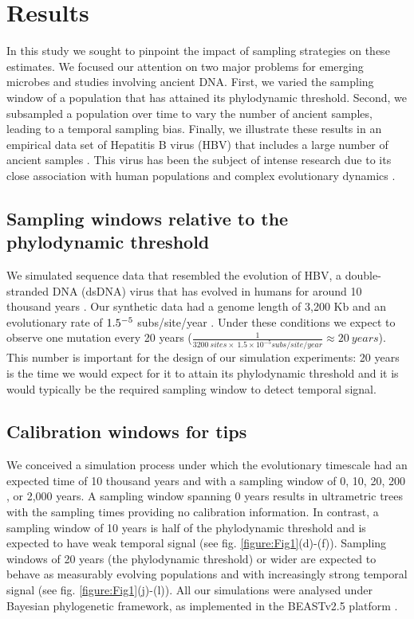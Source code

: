 \documentclass[11pt]{article}
\begin{document}
\section{Results}
In this study we sought to pinpoint the impact of sampling strategies on these estimates. We focused our attention on two major problems for emerging microbes and studies involving ancient DNA. First, we varied the sampling window of a population that has attained its phylodynamic threshold. Second, we subsampled a population over time to vary the number of ancient samples, leading to a temporal sampling bias. Finally, we illustrate these results in an empirical data set of Hepatitis B virus (HBV) that includes a large number of ancient samples \citep{kocher2021ten}. This virus has been the subject of intense research due to its close association with human populations and complex evolutionary dynamics \citep{paraskevis2013dating, ross2018paradox, kahila2012tracing}.

\subsection{Sampling windows relative to the phylodynamic threshold}
We simulated sequence data that resembled the evolution of HBV, a double-stranded DNA (dsDNA) virus that has evolved in humans for around 10 thousand years \citep{kocher2021ten}. Our synthetic data had a genome length of 3,200 Kb and an evolutionary rate of $1.5\time10^{-5}$ subs/site/year \citep{kocher2021ten, muhlemann2018ancient}. Under these conditions we expect to observe one mutation every 20 years ($\frac{1}{3200\ sites \times\ 1.5\times10^{-5}subs/site/year}\approx20\ years$). This number is important for the design of our simulation experiments: 20 years is the time we would expect for it to attain its phylodynamic threshold and it is would typically be the required sampling window to detect temporal signal.

\subsection{Calibration windows for tips}
We conceived a simulation process under which the evolutionary timescale had an expected time of 10 thousand years and with a sampling window of 0, 10, 20, 200 , or 2,000 years. A sampling window spanning 0 years results in ultrametric trees with the sampling times providing no calibration information. In contrast, a sampling window of 10 years is half of the phylodynamic threshold and is expected to have weak temporal signal (see fig. \ref{figure:Fig1}(d)-(f)). Sampling windows of 20 years (the phylodynamic threshold) or wider are expected to behave as measurably evolving populations and with increasingly strong temporal signal (see fig. \ref{figure:Fig1}(j)-(l)). All our simulations were analysed under Bayesian phylogenetic framework, as implemented in the BEASTv2.5 platform \citep{bouckaert2019beast}.
\end{document}
